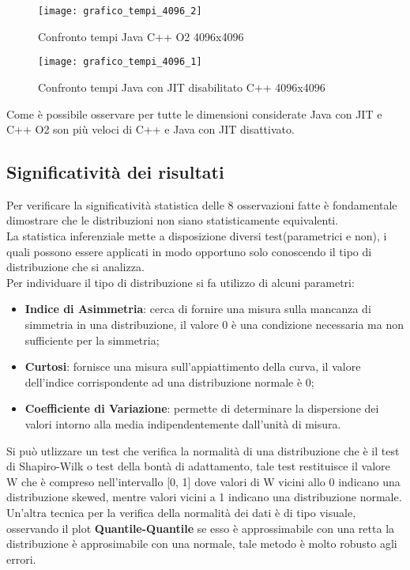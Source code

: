 \begin{figure}[!htbp]
  \texttt{[image: grafico\_tempi\_4096\_2]}
  \caption{Confronto tempi Java C++ O2 4096x4096}
  \label{grafico_tempi_4096_2}
\end{figure}

\begin{figure}[!htbp]
  \texttt{[image: grafico\_tempi\_4096\_1]}
  \caption{Confronto tempi Java con JIT disabilitato C++ 4096x4096}
  \label{grafico_tempi_4096_1}
\end{figure}

Come è possibile osservare per tutte le dimensioni considerate Java con JIT e C++ O2 son più veloci di C++ e
Java con JIT disattivato.\\

\subsection{Significatività dei risultati}

Per verificare la significatività statistica delle 8 osservazioni fatte è fondamentale
dimostrare che le distribuzioni non siano statisticamente equivalenti.\\
La statistica inferenziale mette a disposizione diversi test(parametrici e non),
i quali possono essere applicati in modo opportuno solo conoscendo il tipo di
distribuzione che si analizza.\\
Per individuare il tipo di distribuzione si fa utilizzo di alcuni parametri:

\begin{itemize}
  \item \textbf{Indice di Asimmetria}: cerca di fornire una misura sulla mancanza
  di simmetria in una distribuzione, il valore 0 è una condizione necessaria ma
  non sufficiente per la simmetria;
  \item \textbf{Curtosi}: fornisce una misura sull'appiattimento della curva,
  il valore dell'indice corrispondente ad una distribuzione normale è 0;
  \item \textbf{Coefficiente di Variazione}: permette di determinare la dispersione
  dei valori intorno alla media indipendentemente dall'unità di misura.
\end{itemize}
Si può utlizzare un test che verifica la normalità di una distribuzione che è il
test di Shapiro-Wilk o test della bontà di adattamento, tale test restituisce
il valore W che è compreso nell’intervallo [0, 1] dove valori di W vicini allo 0 indicano
una distribuzione skewed, mentre valori vicini a 1 indicano una distribuzione normale.
Un'altra tecnica per la verifica della normalità dei dati è di tipo visuale, osservando
il plot \textbf{Quantile-Quantile} se esso è approssimabile con una retta la distribuzione
è approsimabile con una normale, tale metodo è molto robusto agli errori.

